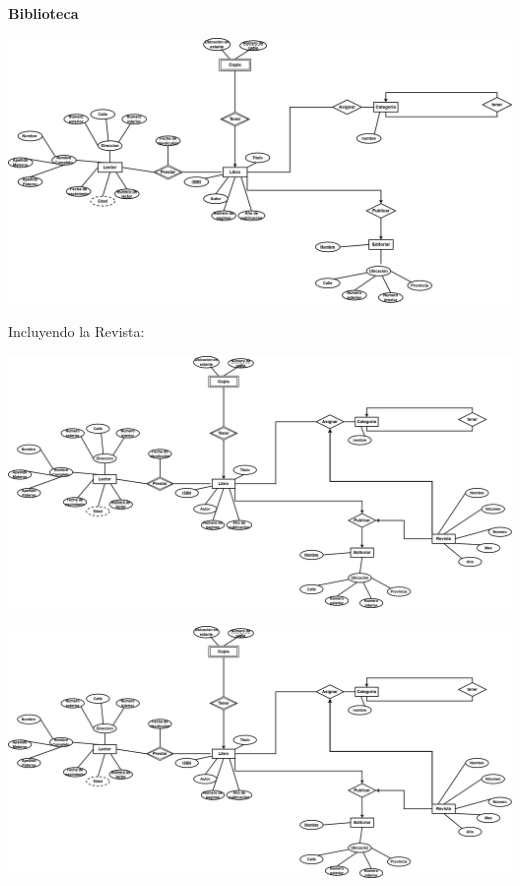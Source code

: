 \textbf{Biblioteca}

\begin{center}
    \includegraphics[width=16cm]{resources/3.a_Biblio.drawio.png}
\end{center}

Incluyendo la Revista:

\begin{center}
    \includegraphics[width=16cm]{resources/3.a_BiblioRevista.drawio.png}
\end{center}

\begin{center}
    \includegraphics[width=16cm]{resources/3.a_BiblioRevista.drawio}
\end{center}

